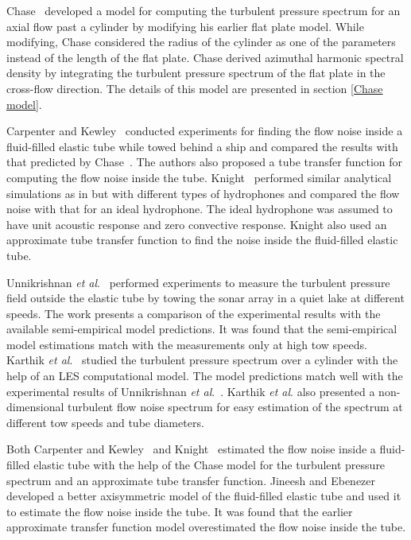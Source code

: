 \documentclass[11pt,cleanfoot]{asme2ej}
\begin{document}
Chase~\cite{Chase1981} developed a model for computing the turbulent pressure spectrum for an axial flow past a cylinder by modifying his earlier flat plate model. While modifying, Chase considered the radius of the cylinder as one of the parameters instead of the length of the flat plate. Chase derived azimuthal harmonic spectral density by integrating the turbulent pressure spectrum of the flat plate in the cross-flow direction. The details of this model are presented in section \ref{Chase model}. 


Carpenter and Kewley~\cite{carpenter1983} conducted experiments for finding the flow noise inside a fluid-filled elastic tube while towed behind a ship and compared the results with that predicted by  Chase~\cite{Chase1981}. The authors also proposed a tube transfer function for computing the flow noise inside the tube. Knight~\cite{knight1996} performed similar analytical simulations as in \cite{carpenter1983} but with different types of hydrophones and compared the flow noise with that for an ideal hydrophone. The ideal hydrophone was assumed to have unit acoustic response and zero convective response. Knight also used an approximate tube transfer function to find the noise inside the fluid-filled elastic tube.\par


Unnikrishnan \textit{et al}.~\cite{Unni2011} performed experiments to measure the turbulent pressure field outside the elastic tube by towing the sonar array in a quiet lake at different speeds. The work presents a comparison of the experimental results with the available semi-empirical model predictions. It was found that the semi-empirical model estimations match with the measurements only at high tow speeds. Karthik \textit{et al}.~\cite{karthik2021} studied the turbulent pressure spectrum over a cylinder with the help of an LES computational model. The model predictions match well with the experimental results of Unnikrishnan \textit{et al}.~\cite{Unni2011}. Karthik \textit{et al}. also presented a non-dimensional turbulent flow noise spectrum for easy estimation of the spectrum at different tow speeds and tube diameters.

Both Carpenter and Kewley~\cite{carpenter1983} and Knight~\cite{knight1996} estimated the flow noise inside a fluid-filled elastic tube with the help of the Chase model for the turbulent pressure spectrum and an approximate tube transfer function. Jineesh and Ebenezer~\cite{jineesh2013} developed a better axisymmetric model of the fluid-filled elastic tube and used it to estimate the flow noise inside the tube. It was found that the earlier approximate transfer function model overestimated the flow noise inside the tube.
\end{document}
